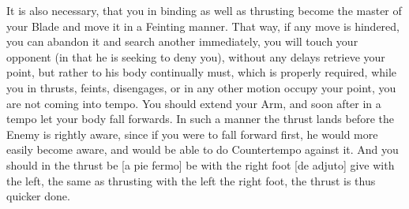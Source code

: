 It is also necessary, that you in binding as well as thrusting become the
master of your Blade and move it in a Feinting manner. That way, if
any move is hindered, you can abandon it and search another
immediately, you will touch your opponent (in that he is seeking to
deny you), without any delays retrieve your point, but rather to his
body continually must, which is properly required, while you in
thrusts, feints, disengages, or in any other motion occupy your point,
you are not coming into tempo. You should extend your Arm, and soon
after in a tempo let your body fall forwards. In such a manner the
thrust lands before the Enemy is rightly aware, since if you were to
fall forward first, he would more easily become aware, and would be
able to do Countertempo against it. And you should in the thrust be [a
pie fermo] be with the right foot [de adjuto] give with the left, the
same as thrusting with the left the right foot, the thrust is thus
quicker done.


